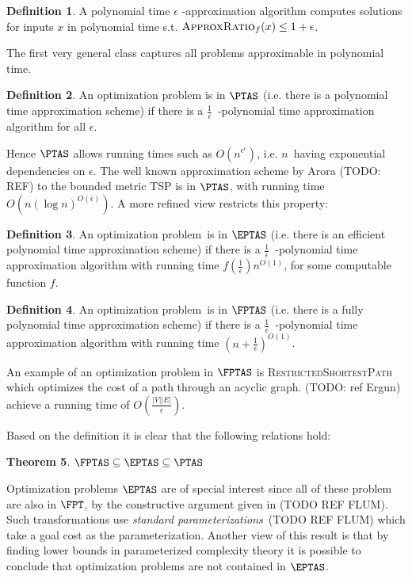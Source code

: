 \documentclass[a4paper,11pt,notitlepage]{report}
\theoremstyle{plain}
\newtheorem{thm}{Theorem}[chapter] %
\theoremstyle{definition}
\newtheorem{defn}[thm]{Definition} %
\begin{document}
\begin{defn}
A polynomial time $\epsilon$ -approximation algorithm computes solutions for inputs $x$ in polynomial time s.t. $\textsc{ApproxRatio}_f(x) \leq 1 + \epsilon$.
\end{defn}

The first very general class captures all problems approximable in polynomial time.

\begin{defn}
An optimization problem is in $\PTAS$ (i.e. there is a polynomial time approximation scheme) if there is a $\frac{1}{\epsilon}$ -polynomial time approximation algorithm for all $\epsilon$.
\end{defn}

Hence $\PTAS$ allows running times such as $O(n^{\epsilon ^ \epsilon})$, i.e. $n$ having exponential dependencies on $\epsilon$.
The well known approximation scheme by Arora (TODO: REF) to the bounded metric TSP is in $\PTAS$, with running time $O(n(\log n)^{O(\epsilon)})$.
A more refined view restricts this property:

\begin{defn}
An optimization problem is in $\EPTAS$ (i.e. there is an efficient polynomial time approximation scheme) if there is a $\frac{1}{\epsilon}$ -polynomial time approximation algorithm with 
running time $f(\frac{1}{\epsilon}) n^{O(1)}$, for some computable function $f$.
\end{defn}

\begin{defn}
An optimization problem is in $\FPTAS$ (i.e. there is a fully polynomial time approximation scheme) if there is a $\frac{1}{\epsilon}$ -polynomial time approximation algorithm with 
running time $(n + \frac{1}{\epsilon})^{O(1)}$.
\end{defn}

An example of an optimization problem in $\FPTAS$ is \textsc{RestrictedShortestPath} which optimizes the cost of a path through an acyclic graph.
(TODO: ref Ergun) achieve a running time of $O(\frac{|V| |E|}{\epsilon})$.

Based on the definition it is clear that the following relations hold:

\begin{thm}
$\FPTAS \subseteq \EPTAS \subseteq \PTAS$
\end{thm}

Optimization problems $\EPTAS$ are of special interest since all of these problem are also in $\FPT$, by the constructive argument given in (TODO REF FLUM).
Such transformations use \emph{standard parameterizations} (TODO REF FLUM) which take a goal cost as the parameterization.
Another view of this result is that by finding lower bounds in parameterized complexity theory it is possible to conclude that optimization problems are not contained in $\EPTAS$.
\end{document}
